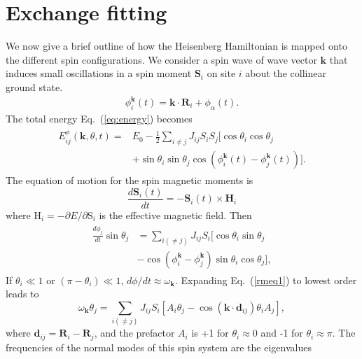\documentclass[aps,pre,reprint,superscriptaddress,longbibliography]{revtex4-1}
\renewcommand{\vec}[1]{{\ensuremath{\bm{\mathrm{#1}}}}}
\begin{document}
\section{Exchange fitting}
We now give a brief outline of how the Heisenberg Hamiltonian is mapped onto the different spin configurations. We consider a spin wave of wave vector $\mathbf{k}$ that induces small oscillations in a spin moment $\mathbf{S}_i$ on site $i$ about the collinear ground state.
%
\begin{eqnarray}
        \phi_i^\mathbf{k}(t)=\mathbf{k}\cdot\mathbf{R}_i+\phi_\alpha(t).
        \label{phi}
\end{eqnarray}
%
The total energy Eq.~(\ref{eq:energy}) becomes
%
\begin{eqnarray}
        \begin{aligned}
                E_{ij}^{\phi}(\mathbf{k},\theta,t)= & E_0-\frac{1}{2}\sum_{i \neq j}J_{ij}S_iS_j[\cos\theta_i\cos\theta_j\\
                &+\sin\theta_i\sin\theta_j\cos(\phi_i^\mathbf{k}(t)-\phi_j^\mathbf{k}(t))].
        \end{aligned}
        \label{etotinss}
\end{eqnarray}
%
The equation of motion for the spin magnetic moments is
%
\begin{equation}
        \frac{d\mathbf{S}_i(t)}{dt} = -\mathbf{S}_{i}(t)\times\mathbf{H}_{i}
\end{equation}
%
where $\vec{H}_{i} = -\partial E / \partial \vec{S}_{i}$ is the effective magnetic field. Then %
\begin{eqnarray}
        \begin{aligned}
                \frac{d\phi_j}{dt}\sin\theta_j&=\sum_{i(\neq j)} J_{ij}S_{i}[\cos\theta_i\sin\theta_j\\
                &-\cos(\phi_i^\mathbf{k}-\phi_j^\mathbf{k})\sin\theta_i\cos\theta_j],
        \end{aligned}
        \label{rmeq1}
\end{eqnarray}
%
If $\theta_i \ll 1$ or $(\pi-\theta_i) \ll1 $, $d\phi/ dt\approx\omega_{\mathbf{k}}$. Expanding Eq.~(\ref{rmeq1}) to lowest order leads to
%
\begin{equation}
\omega_\mathbf{k}\theta_j=\sum_{i(\neq j)} J_{ij}S_{i}[A_i\theta_j-\cos(\mathbf{k}\cdot\mathbf{d}_{ij})\theta_i A_j],
\label{eq:rmeq2}
\end{equation}
%
where $\mathbf{d}_{ij}=\mathbf{R}_{i}-\mathbf{R}_{j}$, and the prefactor $A_i$ is +1 for $\theta_i \approx 0$ and -1 for $\theta_i \approx \pi$. The frequencies of the normal modes of this spin system are the eigenvalues
\end{document}
